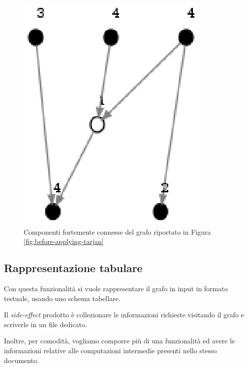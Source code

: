 \begin{figure}
  \centering
  \includegraphics{images/OnePipingLevelUnitTest_Printer_DFS_PrinterPipe_Crescenzi-phase-PrinterPipeFilter-level-2.eps}
  \caption{Componenti fortemente connesse del grafo riportato in
    Figura \ref{fig:before-applying-tarjan}}
  \label{fig:tarjan-output}
\end{figure}

\subsection{Rappresentazione tabulare}
Con questa funzionalit\`a si vuole rappresentare il grafo in input in
formato testuale, usando uno schema tabellare.

Il \emph{side-effect} prodotto \`e collezionare le informazioni
richieste visitando il grafo e scriverle in un file dedicato.

Inoltre, per comodit\`a, vogliamo comporre pi\`u di una funzionalit\`a
ed avere le informazioni relative alle computazioni intermedie
presenti nello stesso documento.

